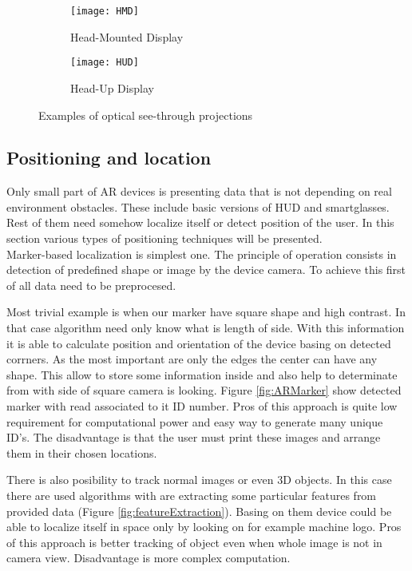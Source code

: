 \documentclass[printmode,en]{mgr}
\begin{document}
\begin{figure}[!ht]
\centering
\begin{subfigure}{.5\textwidth}
  \centering
  \texttt{[image: HMD]}
  \caption{Head-Mounted Display}
  \label{fig:headMounted}
\end{subfigure}%
\begin{subfigure}{.5\textwidth}
  \centering
  \texttt{[image: HUD]}
  \caption{Head-Up Display \cite{HUD}}
  \label{fig:headUp}
\end{subfigure}
\caption{Examples of optical see-through projections}
\label{fig:seeThroughAR}
\end{figure}

\subsection{Positioning and location}
Only small part of AR devices is presenting data that is not depending on real environment obstacles. These include basic versions of HUD and smartglasses. Rest of them need somehow localize itself or detect position of the user. In this section various types of positioning techniques will be presented.\\

Marker-based localization is simplest one. The principle of operation consists in detection of predefined shape or image by the device camera. To achieve this first of all data need to be preprocesed.

Most trivial example is when our marker have square shape and high contrast. In that case algorithm need only know what is length of side. With this information it is able to calculate position and orientation of the device basing on detected corrners. As the most important are only the edges the center can have any shape. This allow to store some information inside and also help to determinate from with side of square camera is looking. Figure \ref{fig:ARMarker} show detected marker with read associated to it ID number. Pros of this approach is quite low requirement for computational power and easy way to generate many unique ID's. The disadvantage is that the user must print these images and arrange them in their chosen locations.

There is also posibility to track normal images or even 3D objects. In this case there are used algorithms with are extracting some particular features from provided data (Figure \ref{fig:featureExtraction}). Basing on them device could be able to localize itself in space only by looking on for example machine logo. Pros of this approach is better tracking of object even when whole image is not in camera view. Disadvantage is more complex computation.
\end{document}
